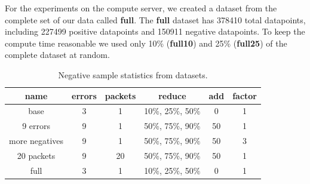 \documentclass[
	ngerman,
	ruledheaders=section,%
	class=report,%
	thesis={type=bachelor},%
	accentcolor=9c,%
	custommargins=true,%
	marginpar=false,%
	parskip=half-,%
	fontsize=11pt,%
]{tudapub}
\begin{document}
For the experiments on the compute server, we created a dataset from the complete set of our data called \textbf{full}.
The \textbf{full} dataset has 378410 total datapoints, including 227499 positive datapoints and 150911 negative datapoints.
To keep the compute time reasonable we used only 10\% (\textbf{full10}) and 25\% (\textbf{full25}) of the complete dataset at random.







\begin{table}
    \centering
    \begin{tabular}{|c|c|c|c|c|c|}
        \hline
        \textbf{name} & \textbf{errors} & \textbf{packets} & \textbf{reduce} & \textbf{add} & \textbf{factor} \\
        \hline
        base & 3 & 1 & 10\%, 25\%, 50\% & 0 & 1 \\
        \hline
        9 errors & 9 & 1 & 50\%, 75\%, 90\% & 50 & 1 \\
        \hline
        more negatives & 9 & 1 & 50\%, 75\%, 90\% & 50 & 3 \\
        \hline
        20 packets & 9 & 20 & 50\%, 75\%, 90\% & 50 & 1 \\
        \hline
        full & 3 & 1 & 10\%, 25\%, 50\% & 0 & 1 \\
        \hline
    \end{tabular}
    \caption{Negative sample statistics from datasets.}
    \label{tab:negativeSamples}
\end{table}
\end{document}
